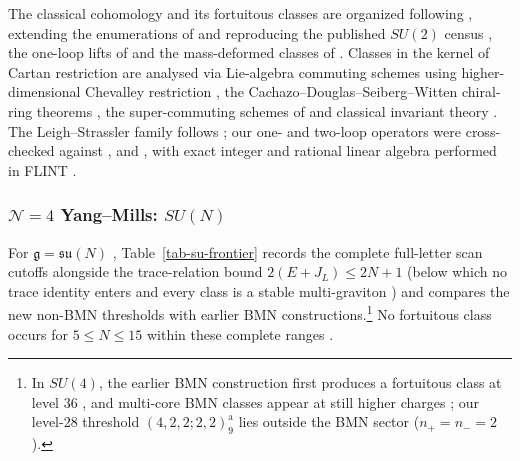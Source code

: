 \documentclass[11pt]{article}
\numberwithin{equation}{section}
\numberwithin{figure}{section}
\numberwithin{table}{section}
\begin{document}
The classical cohomology and its fortuitous classes are organized following \cite{ChangYin,microstates,ChangLinWords,ChangChevalley}, extending the enumerations of \cite{ChangLin,GLRT,KLLS,BraneFused} and reproducing the published $SU(2)$ census \cite{BPSCounting}, the one-loop lifts of \cite{KonishiBH,KKLP} and the mass-deformed classes of \cite{CK}. Classes in the kernel of Cartan restriction are analysed via Lie-algebra commuting schemes using higher-dimensional Chevalley restriction \cite{ChenNgo,ChenNgoSp,SXX,Vaccarino,Domokos,Hunziker,Richardson,LNY,SemplinerYang,Goyal}, the Cachazo--Douglas--Seiberg--Witten chiral-ring theorems \cite{CDSW,EtingofKac,CederwallFerretti,Kumar,WittenSpSO,EtingofII}, the super-commuting schemes of \cite{KvLM} and classical invariant theory \cite{Sergeev,BereleRegev,GoodmanWallach,LehrerZhang,Bourbaki}. The Leigh--Strassler family follows \cite{LeighStrassler,BundzikMansson}; our one- and two-loop operators were cross-checked against \cite{BK,KKLP}, \cite[Section 4.5]{GWW} and \cite{FortuityAI}, with exact integer and rational linear algebra performed in FLINT \cite{FLINT}.

\subsubsection{$\mathcal N=4$ Yang--Mills: $SU(N)$}\label{sec-results-SU}

For $\mathfrak g=\mathfrak{su}(N)$ \cite[results report, \S1.1]{Repo}, Table~\ref{tab-su-frontier} records the complete full-letter scan cutoffs alongside the trace-relation bound $2(E+J_L)\le 2N+1$ (below which no trace identity enters and every class is a stable multi-graviton \cite{ChangYin,ChangLinWords}) and compares the new non-BMN thresholds with earlier BMN constructions.\footnote{In $SU(4)$, the earlier BMN construction first produces a fortuitous class at level $36$ \cite[Sections 3.3 and 4.3]{KLLS}, and multi-core BMN classes appear at still higher charges \cite{MultiCore}; our level-$28$ threshold $(4,2,2;2,2)_9^{\mathrm{a}}$ lies outside the BMN sector ($n_+=n_-=2$).} No fortuitous class occurs for $5\le N\le 15$ within these complete ranges \cite[supplement, Section S2.1]{Repo}.
\end{document}
